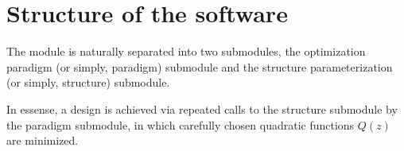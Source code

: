 % 
\section{Structure of the software}

The module is naturally separated into two submodules, 
    the optimization paradigm (or simply, paradigm) submodule 
    and the structure parameterization (or simply, structure) submodule.

% 
% 
% 
% 
% 
% 
% 
% 
In essense, a design is achieved via repeated calls to the structure submodule
    by the paradigm submodule,
    in which carefully chosen quadratic functions $Q(z)$ are minimized.

